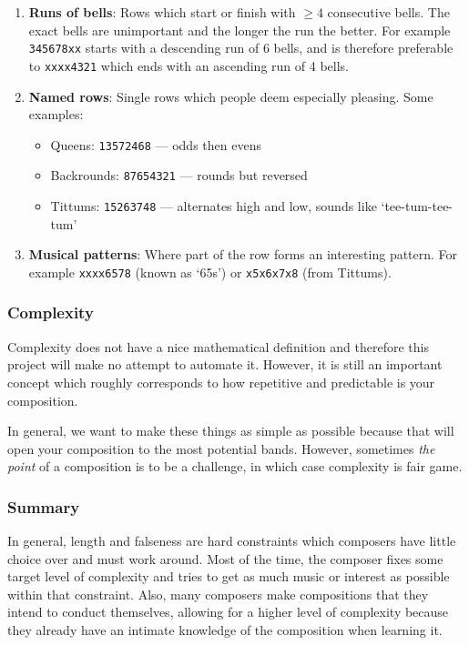 \documentclass[12pt]{article}
\newcommand{\row}[1]{\texttt{#1}}
\begin{document}
\begin{enumerate}
    \item \textbf{Runs of bells}: Rows which start or finish with $\ge 4$ consecutive bells.
        The exact bells are unimportant and the longer the run the better.  For example
        \row{345678xx} starts with a descending run of 6 bells, and is therefore preferable to
        \row{xxxx4321} which ends with an ascending run of 4 bells.
    \item \textbf{Named rows}: Single rows which people deem especially pleasing.  Some examples:
        \begin{itemize}
            \item Queens: \row{13572468} --- odds then evens
            \item Backrounds: \row{87654321} --- rounds but reversed
            \item Tittums: \row{15263748} --- alternates high and low, sounds like `tee-tum-tee-tum'
        \end{itemize}
    \item \textbf{Musical patterns}: Where part of the row forms an interesting pattern.  For
        example \row{xxxx6578} (known as `65s') or \row{x5x6x7x8} (from Tittums).
\end{enumerate}

\subsubsection{Complexity}

Complexity does not have a nice mathematical definition and therefore this project will make no
attempt to automate it.  However, it is still an important concept which roughly corresponds to how
repetitive and predictable is your composition.

In general, we want to make these things as simple as possible because that will open your
composition to the most potential bands.  However, sometimes \emph{the point} of a composition is to
be a challenge, in which case complexity is fair game.

\subsubsection{Summary}

In general, length and falseness are hard constraints which composers have little choice over and
must work around.  Most of the time, the composer fixes some target level of complexity and tries
to get as much music or interest as possible within that constraint.  Also, many composers make
compositions that they intend to conduct themselves, allowing for a higher level of complexity
because they already have an intimate knowledge of the composition when learning it.
\end{document}
